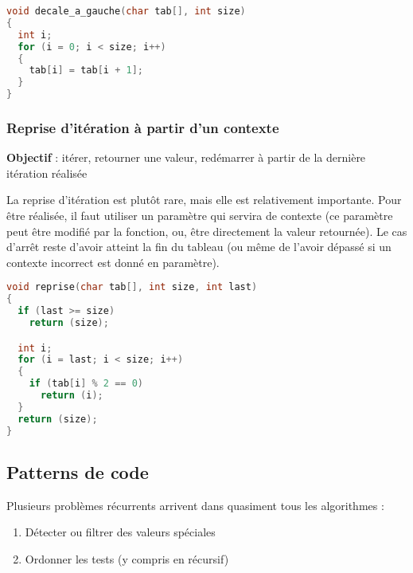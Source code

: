 \documentclass[11pt,a4paper]{article}
\begin{document}
\vspace*{-0.6cm}

\begin{lstlisting}[language=C]
void decale_a_gauche(char tab[], int size)
{
  int i;
  for (i = 0; i < size; i++)
  {
    tab[i] = tab[i + 1];
  }
} \end{lstlisting}

\vspace*{-0.5cm}


\subsubsection{Reprise d'itération à partir d'un contexte}

\textbf{Objectif} : itérer, retourner une valeur, redémarrer à partir de la dernière itération réalisée

\bigskip

La reprise d'itération est plutôt rare, mais elle est relativement importante.
Pour être réalisée, il faut utiliser un paramètre qui servira de contexte (ce paramètre peut être modifié par la fonction, ou, être directement la valeur retournée).
Le cas d'arrêt reste d'avoir atteint la fin du tableau (ou même de l'avoir dépassé si un contexte incorrect est donné en paramètre).

\medskip

\begin{lstlisting}[language=C]
void reprise(char tab[], int size, int last)
{
  if (last >= size)
    return (size);

  int i;
  for (i = last; i < size; i++)
  {
    if (tab[i] % 2 == 0)
      return (i);
  }
  return (size);
} \end{lstlisting}

\bigskip

\clearpage

\subsection{Patterns de code}

Plusieurs problèmes récurrents arrivent dans quasiment tous les algorithmes :

\begin{enumerate}
\item Détecter ou filtrer des valeurs spéciales
\item Ordonner les tests (y compris en récursif)
\end{enumerate}
\end{document}
